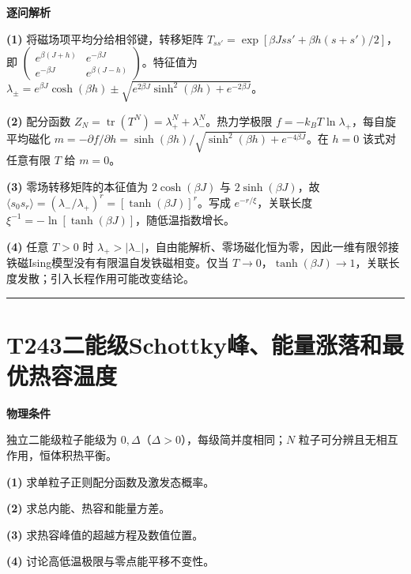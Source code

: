 \documentclass[UTF8,a4paper,11pt,oneside,openany]{ctexbook}
\begin{document}
\par\medskip\noindent\textbf{逐问解析}
\par\noindent\textbf{(1)} 将磁场项平均分给相邻键，转移矩阵 \(T_{ss'}=\exp[\beta Jss'+\beta h(s+s')/2]\)，即 \(\begin{pmatrix}e^{\beta(J+h)}&e^{-\beta J}\\e^{-\beta J}&e^{\beta(J-h)}\end{pmatrix}\)。特征值为 \(\lambda_\pm=e^{\beta J}\cosh(\beta h)\pm\sqrt{e^{2\beta J}\sinh^2(\beta h)+e^{-2\beta J}}\)。
\par\noindent\textbf{(2)} 配分函数 \(Z_N=\operatorname{tr}(T^N)=\lambda_+^N+\lambda_-^N\)。热力学极限 \(f=-k_BT\ln\lambda_+\)，每自旋平均磁化 \(m=-\partial f/\partial h=\sinh(\beta h)/\sqrt{\sinh^2(\beta h)+e^{-4\beta J}}\)。在 \(h=0\) 该式对任意有限 \(T\) 给 \(m=0\)。
\par\noindent\textbf{(3)} 零场转移矩阵的本征值为 \(2\cosh(\beta J)\) 与 \(2\sinh(\beta J)\)，故 \(\langle s_0s_r\rangle=(\lambda_-/\lambda_+)^r=[\tanh(\beta J)]^r\)。写成 \(e^{-r/\xi}\)，关联长度 \(\xi^{-1}=-\ln[\tanh(\beta J)]\)，随低温指数增长。
\par\noindent\textbf{(4)} 任意 \(T>0\) 时 \(\lambda_+>|\lambda_-|\)，自由能解析、零场磁化恒为零，因此一维有限邻接铁磁Ising模型没有有限温自发铁磁相变。仅当 \(T\to0\)，\(\tanh(\beta J)\to1\)，关联长度发散；引入长程作用可能改变结论。

\par\bigskip\hrule\bigskip
\section*{T243\quad 二能级Schottky峰、能量涨落和最优热容温度}
\textbf{物理条件}\par 独立二能级粒子能级为 \(0,\Delta\)（\(\Delta>0\)），每级简并度相同；\(N\) 粒子可分辨且无相互作用，恒体积热平衡。
\par\noindent\textbf{(1)} 求单粒子正则配分函数及激发态概率。
\par\noindent\textbf{(2)} 求总内能、热容和能量方差。
\par\noindent\textbf{(3)} 求热容峰值的超越方程及数值位置。
\par\noindent\textbf{(4)} 讨论高低温极限与零点能平移不变性。
\end{document}
